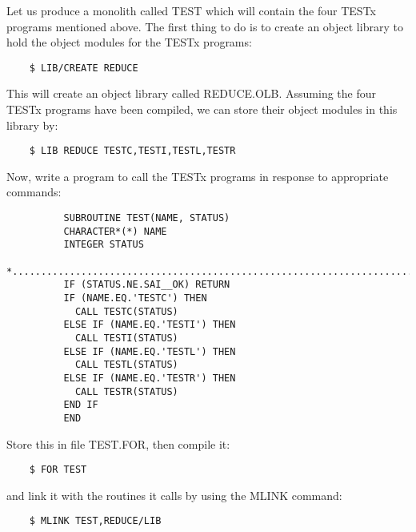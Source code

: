 Let us produce a monolith called TEST which will contain the four TESTx programs
mentioned above.
The first thing to do is to create an object library to hold the object
modules for the TESTx programs:

\begin{small}
\begin{verbatim}
    $ LIB/CREATE REDUCE
\end{verbatim}
\end{small}

This will create an object library called REDUCE.OLB.
Assuming the four TESTx programs have been compiled, we can store their
object modules in this library by:

\begin{small}
\begin{verbatim}
    $ LIB REDUCE TESTC,TESTI,TESTL,TESTR
\end{verbatim}
\end{small}

Now, write a program to call the TESTx programs in response to appropriate
commands:

\begin{small}
\begin{verbatim}
          SUBROUTINE TEST(NAME, STATUS)
          CHARACTER*(*) NAME
          INTEGER STATUS
    *...........................................................................
          IF (STATUS.NE.SAI__OK) RETURN
          IF (NAME.EQ.'TESTC') THEN
            CALL TESTC(STATUS)
          ELSE IF (NAME.EQ.'TESTI') THEN
            CALL TESTI(STATUS)
          ELSE IF (NAME.EQ.'TESTL') THEN
            CALL TESTL(STATUS)
          ELSE IF (NAME.EQ.'TESTR') THEN
            CALL TESTR(STATUS)
          END IF
          END
\end{verbatim}
\end{small}

Store this in file TEST.FOR, then compile it:

\begin{small}
\begin{verbatim}
    $ FOR TEST
\end{verbatim}
\end{small}

and link it with the routines it calls by using the MLINK command:

\begin{small}
\begin{verbatim}
    $ MLINK TEST,REDUCE/LIB
\end{verbatim}
\end{small}

